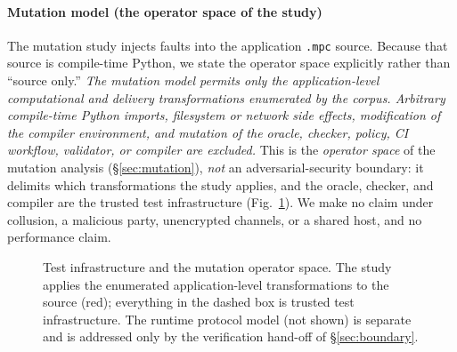 \documentclass[conference]{IEEEtran}
\newcommand{\code}[1]{\texttt{\small #1}}
\begin{document}
\paragraph{Mutation model (the operator space of the study)}
The mutation study injects faults into the application \code{.mpc} source. Because that
source is compile-time Python, we state the operator space explicitly rather than
``source only.'' \emph{The mutation model permits only the application-level
computational and delivery transformations enumerated by the corpus. Arbitrary
compile-time Python imports, filesystem or network side effects, modification of the
compiler environment, and mutation of the oracle, checker, policy, CI workflow,
validator, or compiler are excluded.} This is the \emph{operator space} of the mutation
analysis (\S\ref{sec:mutation}), \emph{not} an adversarial-security boundary: it delimits
which transformations the study applies, and the oracle, checker, and compiler are the
trusted test infrastructure (Fig.~\ref{fig:arch}). We make no claim under collusion, a
malicious party, unencrypted channels, or a shared host, and no performance claim.

\begin{figure}[t]
\centering
{}
\caption{Test infrastructure and the mutation operator space. The study applies the
enumerated application-level transformations to the source (red); everything in the
dashed box is trusted test infrastructure. The runtime protocol model (not shown) is
separate and is addressed only by the verification hand-off of \S\ref{sec:boundary}.}
\label{fig:arch}
\end{figure}
\end{document}
